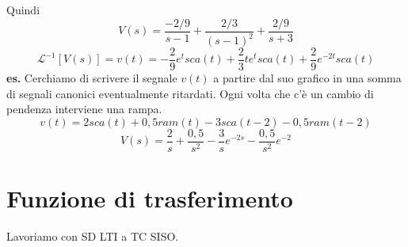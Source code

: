 Quindi
\[
    V(s) = \frac{-2/9}{s-1} + \frac{2/3}{(s-1)^2} + \frac{2/9}{s+3}
\]
\[
    \mathcal{L}^{-1}[V(s)] = v(t) = -\frac{2}{9} e^{t} sca(t) + \frac{2}{3} t e^{t} sca(t) + \frac{2}{9}e^{-2t} sca(t)
\]
\newline
\newline
\textbf{es.}\newline 
Cerchiamo di scrivere il segnale $v(t)$ a partire dal suo grafico in una somma di segnali canonici eventualmente ritardati.\newline
Ogni volta che c'è un cambio di pendenza interviene una rampa.\newline
\[
    v(t)= 2 sca(t) + 0,5 ram(t) - 3 sca(t-2) - 0,5 ram(t-2)
\] 
\[
    V(s) = \frac{2}{s} + \frac{0,5}{s^2} - \frac{3}{s}e^{-2s} - \frac{0,5}{s^2}e^{-2} 
\]
\newpage
\section{Funzione di trasferimento}
Lavoriamo con SD LTI a TC SISO.
